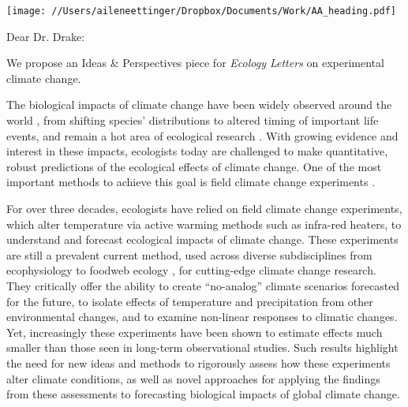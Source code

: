 \documentclass[12pt,a4paper]{letter}
\begin{document}
\begin{letter}{}



\renewcommand{\refname}{\CHead{}}

\texttt{[image: //Users/aileneettinger/Dropbox/Documents/Work/AA\_heading.pdf]}

\opening{Dear Dr. Drake:}
We propose an Ideas \& Perspectives piece for \emph{Ecology Letters} on experimental climate change. 

The biological impacts of climate change have been widely observed around the world \citep{ipcc2013}, from shifting species' distributions to altered timing of important life events, and remain a hot area of ecological research \citep{goring2017}. With growing evidence and interest in these impacts, ecologists today are challenged to make quantitative, robust predictions of the ecological effects of climate change. One of the most important methods to achieve this goal is field climate change experiments \citep{harte1995,cleland2006,Hoeppner2012} .

For over three decades, ecologists have relied on field climate change experiments, which alter temperature via active warming methods such as infra-red heaters, to understand and forecast ecological impacts of climate change. These experiments are still a prevalent current method, used across diverse subdisciplines from ecophysiology\citep{reich2015} to foodweb ecology \citep{barton2009}, for cutting-edge climate change research. They critically offer the ability to create ``no-analog'' climate scenarios forecasted for the future, to isolate effects of temperature and precipitation from other environmental changes, and to examine non-linear responses to climatic changes. Yet, increasingly these experiments have been shown to estimate effects much smaller than those seen in long-term observational studies\citep{wolkovich12}. Such results highlight the need for new ideas and methods to rigorously assess how these experiments alter climate conditions, as well as novel approaches for applying the findings from these assessments to forecasting biological impacts of global climate change. 


\end{letter}
\end{document}
